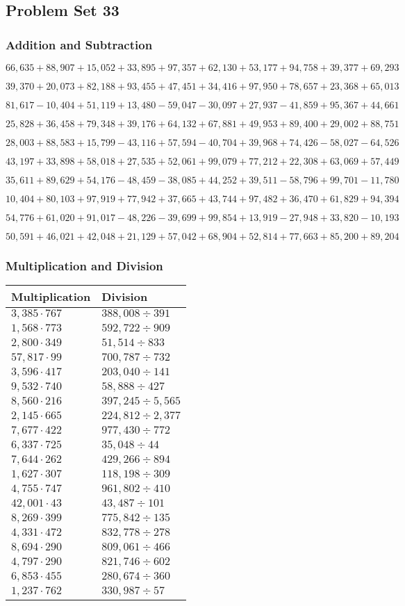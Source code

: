 \hypertarget{problem-set-33-4}{%
\subsection{Problem Set 33}\label{problem-set-33-4}}

\hypertarget{addition-and-subtraction-255}{%
\subsubsection{Addition and
Subtraction}\label{addition-and-subtraction-255}}

\(66,635+88,907+15,052+33,895+97,357+62,130+53,177+94,758+39,377+ 69,293\)

\(39,370+20,073+82,188+93,455+47,451+34,416+97,950+78,657+23,368+65,013\)

\(81,617-10,404+51,119+13,480-59,047-30,097+27,937-41,859+95,367+44,661\)

\(25,828+36,458+79,348+39,176+64,132+67,881+49,953+89,400+29,002+88,751\)

\(28,003+88,583+15,799-43,116+57,594-40,704+39,968+74,426-58,027-64,526\)

\(43,197+33,898+58,018+27,535+52,061+99,079+77,212+22,308+63,069+57,449\)

\(35,611+89,629+54,176-48,459-38,085+44,252+39,511-58,796+99,701-11,780\)

\(10,404+80,103+97,919+77,942+37,665+43,744+97,482+36,470+61,829+94,394\)

\(54,776+61,020+91,017-48,226-39,699+99,854+13,919-27,948+33,820-10,193\)

\(50,591+46,021+42,048+21,129+57,042+68,904+52,814+77,663+85,200+89,204\)

\hypertarget{multiplication-and-division-254}{%
\subsubsection{Multiplication and
Division}\label{multiplication-and-division-254}}

\begin{longtable}[]{@{}ll@{}}
\toprule
Multiplication & Division\tabularnewline
\midrule
\endhead
\(3,385\cdot767\) & \(388,008÷391\)\tabularnewline
\(1,568\cdot773\) & \(592,722÷909\)\tabularnewline
\(2,800\cdot349\) & \(51,514÷833\)\tabularnewline
\(57,817\cdot99\) & \(700,787÷732\)\tabularnewline
\(3,596\cdot417\) & \(203,040÷141\)\tabularnewline
\(9,532\cdot740\) & \(58,888÷427\)\tabularnewline
\(8,560\cdot216\) & \(397,245÷5,565\)\tabularnewline
\(2,145\cdot665\) & \(224,812÷2,377\)\tabularnewline
\(7,677\cdot422\) & \(977,430÷772\)\tabularnewline
\(6,337\cdot725\) & \(35,048÷44\)\tabularnewline
\(7,644\cdot262\) & \(429,266÷894\)\tabularnewline
\(1,627\cdot307\) & \(118,198÷309\)\tabularnewline
\(4,755\cdot747\) & \(961,802÷410\)\tabularnewline
\(42,001\cdot43\) & \(43,487÷101\)\tabularnewline
\(8,269\cdot399\) & \(775,842÷135\)\tabularnewline
\(4,331\cdot472\) & \(832,778÷278\)\tabularnewline
\(8,694\cdot290\) & \(809,061÷466\)\tabularnewline
\(4,797\cdot290\) & \(821,746÷602\)\tabularnewline
\(6,853\cdot455\) & \(280,674÷360\)\tabularnewline
\(1,237\cdot762\) & \(330,987÷57\)\tabularnewline
\bottomrule
\end{longtable}

